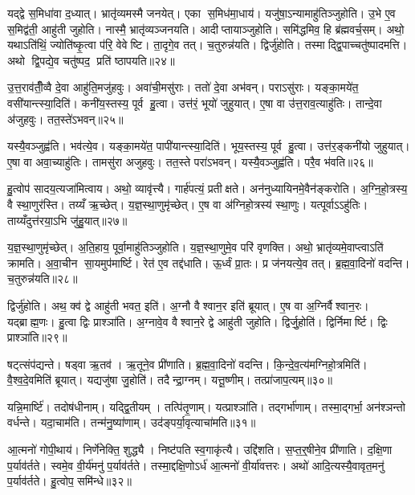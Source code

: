 यद्द्वे स॒मिधा॑वा द॒ध्यात्। भ्रातृ॑व्यमस्मै जनयेत्। एका स॒मिध॑मा॒धाय॑। यजु॑षा॒ऽन्यामाहु॑तिञ्जुहोति। उ॒भे ए॒व स॒मिद्व॑ती॒ आहु॑ती जुहोति। नास्मै॒ भ्रातृ॑व्यञ्जनयति। आदीप्तायाञ्जुहोति। समि॑द्धमिव॒ हि ब्र॑ह्मवर्च॒सम्। अथो॒ यथाऽति॑थिं॒ ज्योति॑ष्कृ॒त्वा प॑रि॒ वेवेष्टि। ता॒दृगे॒व तत्। च॒तुरुन्न॑यति। द्विर्जु॑होति। तस्माद्द्वि॒पाच्चतु॑ष्पादमत्ति। अथो द्वि॒पद्ये॒व चतु॑ष्पद॒ प्रति॑ ष्ठापयति॥२४॥

उ॒त्त॒राव॑तीँ॒व्वै दे॒वा आहु॑ति॒मजु॑हवुः। अवा॑ची॒मसु॑राः। ततो॑ दे॒वा अभ॑वन्। पराऽसु॑राः। यङ्का॒मये॑त॒ वसी॑यान्त्स्या॒दिति॑। कनी॑य॒स्तस्य॒ पूर्व हु॒त्वा। उत्त॑रं॒ भूयो॑ जुहुयात्। ए॒षा वा उ॑त्त॒राव॒त्याहु॑तिः। तान्दे॒वा अ॑जुहवुः। तत॒स्ते॑ऽभवन्॥२५॥

यस्यै॒वञ्जुह्व॑ति। भव॑त्ये॒व। यङ्का॒मये॑त॒ पापी॑यान्त्स्या॒दिति॑। भूय॒स्तस्य॒ पूर्व हु॒त्वा। उत्त॑र॒ङ्कनी॑यो जुहुयात्। ए॒षा वा अवा॒च्याहु॑तिः। तामसु॑रा अजुहवुः। तत॒स्ते परा॑ऽभवन्। यस्यै॒वञ्जुह्व॑ति। परै॒व भ॑वति॥२६॥

हु॒त्वोप॑ सादय॒त्यजा॑मित्वाय। अथो॒ व्यावृ॑त्त्यै। गार्\mbox{}ह॑पत्यं॒ प्रतीक्षते। अन॑नुध्यायिनमे॒वैन॑ङ्करोति। अ॒ग्नि॒हो॒त्रस्य॒ वै स्था॒णुर॑स्ति। तय्यँ ऋ॒च्छेत्। य॒ज्ञ॒स्था॒णुमृ॑च्छेत्। ए॒ष वा अ॑ग्निहो॒त्रस्य॑ स्था॒णुः। यत्पूर्वाऽऽहु॑तिः। ताय्यँदुत्त॑रया॒ऽभि जु॑हु॒यात्॥२७॥

य॒ज्ञ॒स्था॒णुमृ॑च्छेत्। अ॒ति॒हाय॒ पूर्वा॒माहु॑तिञ्जुहोति। य॒ज्ञ॒स्था॒णुमे॒व परि॑ वृणक्ति। अथो॒ भ्रातृ॑व्यमे॒वाप्त्वाऽति॑ क्रामति। अ॒वा॒चीन सा॒यमुप॑मार्ष्टि। रेत॑ ए॒व तद्द॑धाति। ऊ॒र्ध्वं प्रा॒तः। प्र ज॑नयत्ये॒व तत्। ब्र॒ह्म॒वा॒दिनो॑ वदन्ति। च॒तुरुन्न॑यति॥२८॥

द्विर्जु॑होति। अथ॒ क्व॑ द्वे आहु॑ती भवत॒ इति॑। अ॒ग्नौ वैश्वान॒र इति॑ ब्रूयात्। ए॒ष वा अ॒ग्निर्वैश्वान॒रः। यद्ब्राह्म॒णः। हु॒त्वा द्विः प्राश्ञा॑ति। अ॒ग्नावे॒व वैश्वान॒रे द्वे आहु॑ती जुहोति। द्विर्जु॒होति॑। द्विर्निमार्ष्टि। द्विः प्राश्ञा॑ति॥२९॥

षट्त्संप॑द्यन्ते। षड्वा ऋ॒तव॑। ऋ॒तूने॒व प्री॑णाति। ब्र॒ह्म॒वा॒दिनो॑ वदन्ति। कि॒न्दे॒व॒त्य॑मग्निहो॒त्रमिति॑। वै॒श्व॒दे॒वमिति॑ ब्रूयात्। यद्यजु॑षा जु॒होति॑। तदैन्द्रा॒ग्नम्। यत्तू॒ष्णीम्। तत्प्रा॑जाप॒त्यम्॥३०॥

यन्नि॒मार्ष्टि॑। तदोष॑धीनाम्। यद्द्वि॒तीयम्। तत्पि॑तृ॒णाम्। यत्प्राश्ञा॑ति। तद्गर्भा॑णाम्। तस्मा॒द्गर्भा॒ अन॑श्ञन्तो वर्धन्ते। यदा॒चाम॑ति। तन्म॑नु॒ष्या॑णाम्। उद॑ङ्पर्या॒वृत्याचा॑मति॥३१॥

आ॒त्मनो॑ गोपी॒थाय॑। निर्णे॑नेक्ति॒ शुद्ध्यै। निष्ट॑पति स्व॒गाकृ॑त्यै। उद्दि॑शति। स॒प्त॒र्॒षीने॒व प्री॑णाति। द॒क्षि॒णा प॒र्याव॑र्तते। स्वमे॒व वी॒र्य॑मनु॑ प॒र्याव॑र्तते। तस्मा॒द्दक्षि॒णोऽर्ध॑ आ॒त्मनो॑ वी॒र्या॑वत्तरः। अथो॑ आदि॒त्यस्यै॒वावृत॒मनु॑ प॒र्याव॑र्तते। हु॒त्वोप॒ समि॑न्धे॥३२॥

